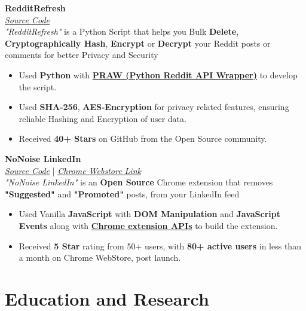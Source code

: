 \documentclass[a4paper,12pt]{article}
\newcommand{\praw}{\href{https://github.com/praw-dev/praw}{PRAW (Python Reddit API Wrapper)}}
\begin{document}
\textbf{RedditRefresh} \\ \textit{\href{https://github.com/karan51ngh/RedditRefresh}{Source Code}} \\
\textit{"RedditRefresh"} is a Python Script that helps you Bulk \textbf{Delete}, \textbf{Cryptographically Hash}, \textbf{Encrypt} or \textbf{Decrypt} your Reddit posts or comments for better Privacy and Security
\begin{itemize}[leftmargin=1.5em]
    \item Used \textbf{Python} with \textbf{\praw} to develop the script.
    \item Used \textbf{SHA-256}, \textbf{AES-Encryption} for privacy related features, ensuring reliable Hashing and Encryption of user data.
    \item Received \textbf{40+ Stars} on GitHub from the Open Source community.
\end{itemize}
\textbf{NoNoise LinkedIn} \\ \textit{\href{https://github.com/karan51ngh/no-noise-linkedin}{Source Code}} | \textit{\href{https://chromewebstore.google.com/detail/nonoise-linkedin/hbcjelfhlljdepmifggbmhnklhmdmldn}{Chrome Webstore Link}} \\
\textit{"NoNoise LinkedIn"} is an \textbf{Open Source} Chrome extension that removes \textbf{"Suggested"} and \textbf{"Promoted"} posts, from your LinkedIn feed
\begin{itemize}[leftmargin=1.5em]
    \item Used Vanilla \textbf{JavaScript} with \textbf{DOM Manipulation} and \textbf{JavaScript Events} along with \textbf{\href{https://developer.chrome.com/docs/extensions/reference/api}{Chrome extension APIs}} to build the extension.
    \item Received \textbf{5 Star} rating from 50+ users, with \textbf{80+ active users} in less than a month on Chrome WebStore, post launch.
\end{itemize}

\section*{\faGraduationCap\hspace{0.5em}Education and Research}
\end{document}
